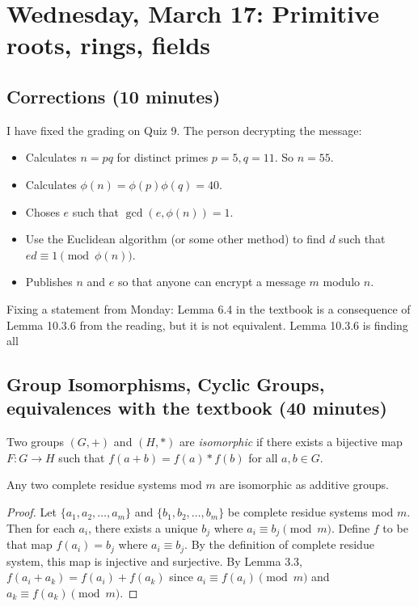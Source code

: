 \documentclass[letterpaper, 11 pt]{article}
\begin{document}
\section{Wednesday, March 17: Primitive roots, rings, fields}
\subsection{Corrections (10 minutes)}

I have fixed the grading on Quiz 9. The person decrypting the message:
\begin{itemize}
 \item Calculates $n=pq$ for distinct primes $p=5, q=11$. So $n=55$.                                                                                                                                                                                                                                                                                                   
\item Calculates $\phi(n)=\phi(p)\phi(q)=40$.
\item Choses $e$ such that $\gcd(e, \phi(n))=1$. 
\item Use the Euclidean algorithm (or some other method) to find $d$ such that $ed\equiv 1 \pmod {\phi(n)}$.
\item Publishes $n$ and $e$ so that anyone can encrypt a message $m$ modulo $n$.
\end{itemize}

Fixing a statement from Monday: Lemma 6.4 in the textbook is a consequence of Lemma 10.3.6 from the reading, but it is not equivalent. Lemma 10.3.6 is finding all 

\subsection{Group Isomorphisms, Cyclic Groups, equivalences with the textbook (40 minutes)}

\begin{defn}
 Two groups $(G,+)$ and $(H,*)$ are \emph{isomorphic} if there exists a bijective map $F:G\to H$ such that $f(a+b)=f(a)*f(b)$ for all $a,b\in G$.
\end{defn}

\begin{prop}
 Any two complete residue systems mod $m$ are isomorphic as additive groups.
\end{prop}
\begin{proof}
 Let $\{a_1,a_2,\dots,a_m\}$ and $\{b_1,b_2,\dots, b_m\}$ be complete residue systems mod $m$. Then for each $a_i$, there exists a unique $b_j$ where $a_i\equiv b_j \pmod m$. Define $f$ to be that map $f(a_i)=b_j$ where $a_i\equiv b_j$. By the definition of complete residue system, this map is injective and surjective. By Lemma 3.3, $f(a_i+a_k)=f(a_i)+f(a_k)$ since $a_i\equiv f(a_i)\pmod m$ and $a_k\equiv f(a_k)\pmod m$.
\end{proof}
\end{document}
